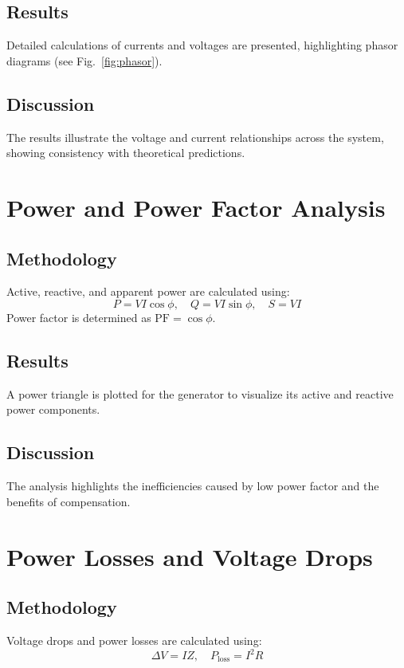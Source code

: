 \documentclass[conference]{IEEEtran}
\begin{document}
\subsection{Results}
Detailed calculations of currents and voltages are presented, highlighting phasor diagrams (see Fig.~\ref{fig:phasor}).

\subsection{Discussion}
The results illustrate the voltage and current relationships across the system, showing consistency with theoretical predictions.

\section{Power and Power Factor Analysis}
\label{sec:power}
\subsection{Methodology}
Active, reactive, and apparent power are calculated using:
\begin{equation}
    P = VI\cos\phi, \quad Q = VI\sin\phi, \quad S = VI
\end{equation}
Power factor is determined as $\text{PF} = \cos\phi$.

\subsection{Results}
A power triangle is plotted for the generator to visualize its active and reactive power components.

\subsection{Discussion}
The analysis highlights the inefficiencies caused by low power factor and the benefits of compensation.

\section{Power Losses and Voltage Drops}
\label{sec:losses}
\subsection{Methodology}
Voltage drops and power losses are calculated using:
\begin{equation}
    \Delta V = IZ, \quad P_{\text{loss}} = I^2R
\end{equation}
\end{document}
